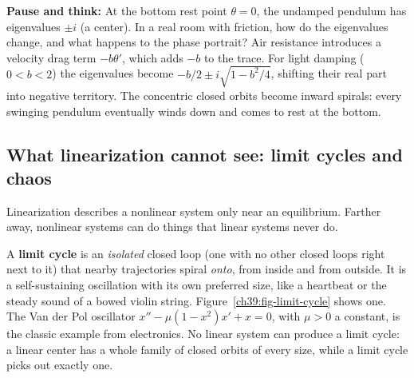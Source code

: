 \begin{walkbox}
\textbf{Pause and think:} At the bottom rest point $\theta = 0$, the undamped
pendulum has eigenvalues $\pm i$ (a center). In a real room with friction, how
do the eigenvalues change, and what happens to the phase portrait? Air
resistance introduces a velocity drag term $-b\theta'$, which adds $-b$ to the
trace. For light damping ($0 < b < 2$) the eigenvalues become
$-b/2 \pm i\sqrt{1 - b^2/4}$, shifting their real
part into negative territory. The concentric closed orbits become inward spirals:
every swinging pendulum eventually winds down and comes to rest at the bottom.
\end{walkbox}

\subsection{What linearization cannot see: limit cycles and chaos}

Linearization describes a nonlinear system only near an equilibrium. Farther
away, nonlinear systems can do things that linear systems never do.

A \textbf{limit cycle} is an \emph{isolated} closed loop (one with no other closed
loops right next to it) that nearby trajectories spiral
\emph{onto}, from inside and from outside. It is a self-sustaining oscillation with its own preferred size,
like a heartbeat or the steady sound of a bowed violin string.
Figure~\ref{ch39:fig-limit-cycle} shows one. The Van der Pol oscillator
$x'' - \mu(1-x^2)x' + x = 0$, with $\mu>0$ a constant, is the classic example from
electronics. No linear system can produce a limit cycle: a linear center has a
whole family of closed orbits of every size, while a limit cycle picks out
exactly one.

